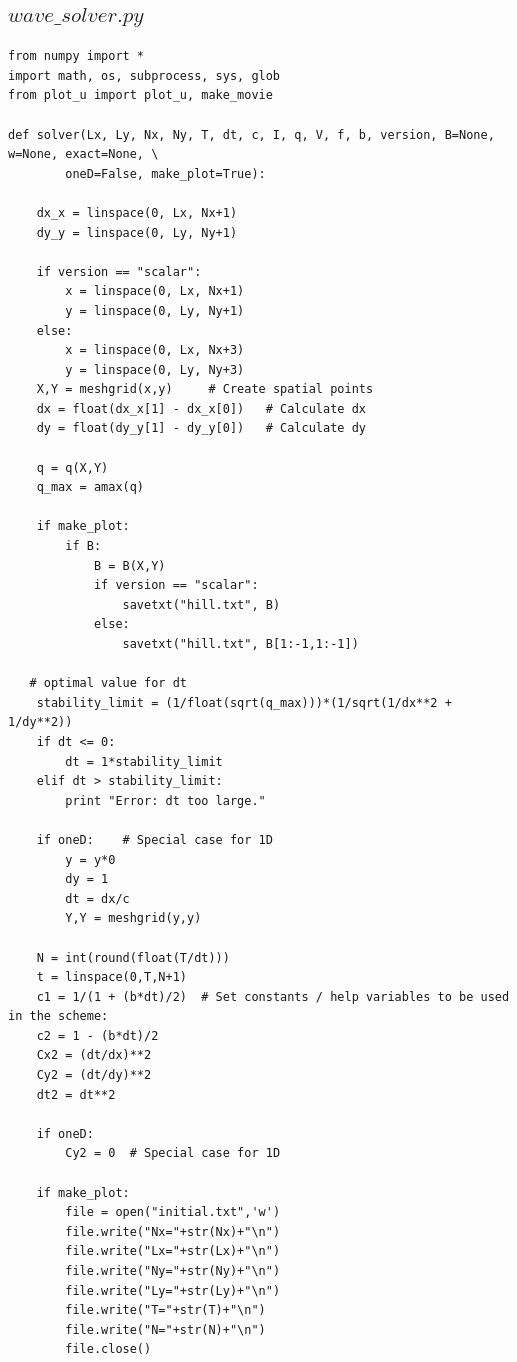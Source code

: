 \documentclass[twoside]{article}
\begin{document}
\subsection{$wave\_solver.py$}
\label{wave:solver:py}

\begin{verbatim}
from numpy import *
import math, os, subprocess, sys, glob
from plot_u import plot_u, make_movie

def solver(Lx, Ly, Nx, Ny, T, dt, c, I, q, V, f, b, version, B=None, w=None, exact=None, \
		oneD=False, make_plot=True):
    
    dx_x = linspace(0, Lx, Nx+1)
    dy_y = linspace(0, Ly, Ny+1)

    if version == "scalar":
        x = linspace(0, Lx, Nx+1)
        y = linspace(0, Ly, Ny+1)
    else:
        x = linspace(0, Lx, Nx+3)
        y = linspace(0, Ly, Ny+3)
    X,Y = meshgrid(x,y)     # Create spatial points
    dx = float(dx_x[1] - dx_x[0])   # Calculate dx
    dy = float(dy_y[1] - dy_y[0])   # Calculate dy

    q = q(X,Y)
    q_max = amax(q)

    if make_plot:
        if B:
            B = B(X,Y)
            if version == "scalar":
                savetxt("hill.txt", B)
            else:
                savetxt("hill.txt", B[1:-1,1:-1])

   # optimal value for dt
    stability_limit = (1/float(sqrt(q_max)))*(1/sqrt(1/dx**2 + 1/dy**2))  
    if dt <= 0:
        dt = 1*stability_limit
    elif dt > stability_limit:
        print "Error: dt too large."

    if oneD:    # Special case for 1D
        y = y*0
        dy = 1
        dt = dx/c
        Y,Y = meshgrid(y,y)

    N = int(round(float(T/dt)))
    t = linspace(0,T,N+1)
    c1 = 1/(1 + (b*dt)/2)  # Set constants / help variables to be used in the scheme:
    c2 = 1 - (b*dt)/2
    Cx2 = (dt/dx)**2
    Cy2 = (dt/dy)**2
    dt2 = dt**2
    
    if oneD:
        Cy2 = 0  # Special case for 1D
        
    if make_plot:    
        file = open("initial.txt",'w')
        file.write("Nx="+str(Nx)+"\n")
        file.write("Lx="+str(Lx)+"\n")
        file.write("Ny="+str(Ny)+"\n")
        file.write("Ly="+str(Ly)+"\n")
        file.write("T="+str(T)+"\n")
        file.write("N="+str(N)+"\n")
        file.close()
    

\end{verbatim}
\end{document}
